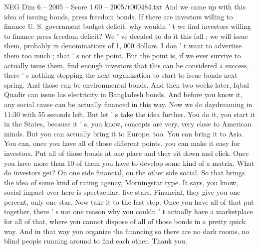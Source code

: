 \begin{textsample}{NEG Dim 6 – 2005 – Score 1.00 – 2005/t000484.txt}
And we came up with this idea of issuing bonds, press freedom bonds.
If there are investors willing to finance U.
S. government budget deficit, why wouldn ' t we find investors willing to finance press freedom deficit?
We ' ve decided to do it this fall ; we will issue them, probably in denominations of 1, 000 dollars.
I don ' t want to advertise them too much ; that ' s not the point.
But the point is, if we ever survive to actually issue them, find enough investors that this can be considered a success, there ' s nothing stopping the next organization to start to issue bonds next spring.
And those can be environmental bonds.
And then two weeks later, Iqbal Quadir can issue his electricity in Bangladesh bonds.
And before you know it, any social cause can be actually financed in this way.
Now we do daydreaming in 11:30 with 55 seconds left.
But let ' s take the idea further.
You do it, you start it in the States, because it ' s, you know, concepts are very, very close to American minds.
But you can actually bring it to Europe, too.
You can bring it to Asia.
You can, once you have all of those different points, you can make it easy for investors.
Put all of those bonds at one place and they sit down and click.
Once you have more than 10 of them you have to develop some kind of a matrix.
What do investors get?
On one side financial, on the other side social.
So that brings the idea of some kind of rating agency, Morningstar type.
It says, you know, social impact over here is spectacular, five stars.
Financial, they give you one percent, only one star.
Now take it to the last step.
Once you have all of that put together, there ' s not one reason why you couldn ' t actually have a marketplace for all of that, where you cannot dispose of all of those bonds in a pretty quick way.
And in that way you organize the financing so there are no dark rooms, no blind people running around to find each other.
Thank you.

\end{textsample}
